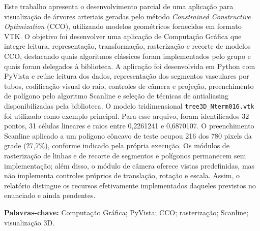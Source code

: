 \begin{tcolorbox}[colback=lightgray,colframe=deepnavy,arc=3pt,title=\textbf{RESUMO},fonttitle=\bfseries]
\small
Este trabalho apresenta o desenvolvimento parcial de uma aplicação para visualização de árvores arteriais geradas pelo método \emph{Constrained Constructive Optimization} (CCO), utilizando modelos geométricos fornecidos em formato VTK. O objetivo foi desenvolver uma aplicação de Computação Gráfica que integre leitura, representação, transformação, rasterização e recorte de modelos CCO, destacando quais algoritmos clássicos foram implementados pelo grupo e quais foram delegados à biblioteca. A aplicação foi desenvolvida em Python com PyVista e reúne leitura dos dados, representação dos segmentos vasculares por tubos, codificação visual do raio, controles de câmera e projeção, preenchimento de polígono pelo algoritmo Scanline e seleção de técnicas de antialiasing disponibilizadas pela biblioteca. O modelo tridimensional \texttt{tree3D\_Nterm016.vtk} foi utilizado como exemplo principal. Para esse arquivo, foram identificados 32 pontos, 31 células lineares e raios entre 0,2261241 e 0,6870107. O preenchimento Scanline aplicado a um polígono côncavo de teste ocupou 216 dos 780 pixels da grade (27,7\%), conforme indicado pela própria execução. Os módulos de rasterização de linhas e de recorte de segmentos e polígonos permanecem sem implementação; além disso, o módulo de câmera oferece vistas predefinidas, mas não implementa controles próprios de translação, rotação e escala. Assim, o relatório distingue os recursos efetivamente implementados daqueles previstos no enunciado e ainda pendentes.
\vspace{0.15cm}

\textbf{Palavras-chave:} Computação Gráfica; PyVista; CCO; rasterização; Scanline; visualização 3D.
\end{tcolorbox}